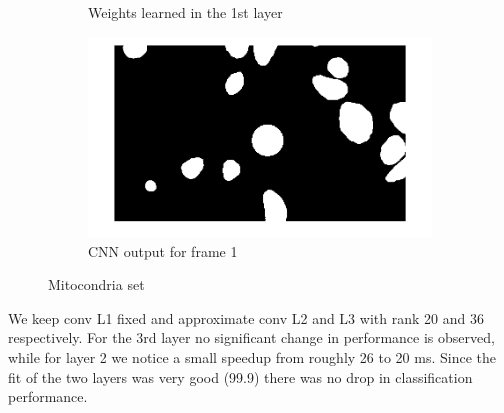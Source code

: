 \begin{figure}[h]
\begin{subfigure}[b]{0.40\textwidth}
    \caption{Weights learned in the 1st layer}
  \end{subfigure}
  \begin{subfigure}[b]{0.40\textwidth}
    \includegraphics[width=\textwidth]{images/GTframe1.png}
    \caption{CNN output for frame 1}
  \end{subfigure}
  \caption{Mitocondria set}
  \label{fig:user_stribution}
\end{figure}
We keep conv L1 fixed and approximate conv L2 and L3 with rank 20 and 36 respectively. For the 3rd layer no significant change in performance is observed, while for layer 2 we notice a small speedup from roughly 26 to 20 ms. Since the fit of the two layers was very good (99.9) there was no drop in classification performance.

